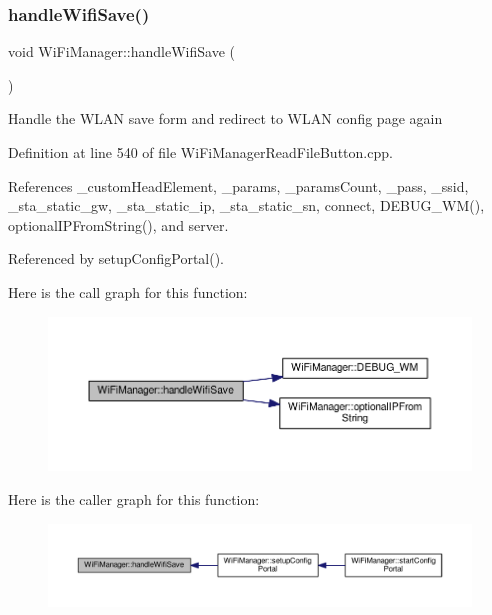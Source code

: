 \subsubsection{\texorpdfstring{handle\+Wifi\+Save()}{handleWifiSave()}}
{\footnotesize\ttfamily void Wi\+Fi\+Manager\+::handle\+Wifi\+Save (\begin{DoxyParamCaption}{ }\end{DoxyParamCaption})\hspace{0.3cm}{\ttfamily [private]}}

Handle the W\+L\+AN save form and redirect to W\+L\+AN config page again 

Definition at line 540 of file Wi\+Fi\+Manager\+Read\+File\+Button.\+cpp.



References \+\_\+custom\+Head\+Element, \+\_\+params, \+\_\+params\+Count, \+\_\+pass, \+\_\+ssid, \+\_\+sta\+\_\+static\+\_\+gw, \+\_\+sta\+\_\+static\+\_\+ip, \+\_\+sta\+\_\+static\+\_\+sn, connect, D\+E\+B\+U\+G\+\_\+\+W\+M(), optional\+I\+P\+From\+String(), and server.



Referenced by setup\+Config\+Portal().

Here is the call graph for this function\+:
\nopagebreak
\begin{figure}[H]
\begin{center}
\leavevmode
\includegraphics[width=350pt]{d4/dc8/class_wi_fi_manager_a2a8c2b60aa86dfdeab8a1a90f7122dc7_cgraph}
\end{center}
\end{figure}
Here is the caller graph for this function\+:
\nopagebreak
\begin{figure}[H]
\begin{center}
\leavevmode
\includegraphics[width=350pt]{d4/dc8/class_wi_fi_manager_a2a8c2b60aa86dfdeab8a1a90f7122dc7_icgraph}
\end{center}
\end{figure}
\mbox{\label{class_wi_fi_manager_ac35e46661f8a209d84bba62d9aa43a35}} 
